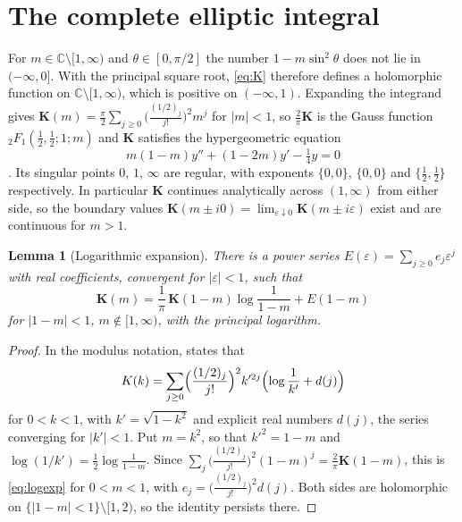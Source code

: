 \documentclass[11pt]{amsart}
\numberwithin{equation}{section}
\newtheorem{lemma}[theorem]{Lemma}
\theoremstyle{definition}
\theoremstyle{remark}
\newcommand{\C}{\mathbb{C}}
\newcommand{\Kc}{\mathbf{K}}
\begin{document}
\section{The complete elliptic integral}\label{sec:elliptic}

For $m\in\C\setminus[1,\infty)$ and $\theta\in[0,\pi/2]$ the number
$1-m\sin^2\theta$ does not lie in $(-\infty,0]$. With the principal square
root, \eqref{eq:K} therefore defines a holomorphic function on
$\C\setminus[1,\infty)$, which is positive on $(-\infty,1)$. Expanding the
integrand gives $\Kc(m)=\frac\pi2\sum_{j\ge0}\bigl(\frac{(1/2)_j}{j!}\bigr)^2m^j$
for $|m|<1$, so $\frac2\pi\Kc$ is the Gauss function
${}_2F_1(\frac12,\frac12;1;m)$ and $\Kc$ satisfies the hypergeometric equation
\begin{equation}\label{eq:hyp}
m(1-m)y''+(1-2m)y'-\tfrac14y=0
\end{equation}
\cite[Section~15.10]{DLMF}. Its singular points $0$, $1$, $\infty$ are regular, with
exponents $\{0,0\}$, $\{0,0\}$ and $\{\frac12,\frac12\}$ respectively. In
particular $\Kc$ continues analytically across $(1,\infty)$ from either side,
so the boundary values $\Kc(m\pm i0)=\lim_{\varepsilon\downarrow0}\Kc(m\pm i\varepsilon)$
exist and are continuous for $m>1$.

\begin{lemma}[Logarithmic expansion]\label{lem:log}
There is a power series $E(\varepsilon)=\sum_{j\ge0}e_j\varepsilon^j$ with real
coefficients, convergent for $|\varepsilon|<1$, such that
\begin{equation}\label{eq:logexp}
\Kc(m)=\frac1\pi\,\Kc(1-m)\log\frac{1}{1-m}+E(1-m)
\end{equation}
for $|1-m|<1$, $m\notin[1,\infty)$, with the principal logarithm.
\end{lemma}

\begin{proof}
In the modulus notation, \cite[19.12.1]{DLMF} states that
\[
K(k)=\sum_{j\ge0}\Bigl(\frac{(1/2)_j}{j!}\Bigr)^2k'^{2j}\Bigl(\log\frac1{k'}+d(j)\Bigr)
\]
for $0<k<1$, with $k'=\sqrt{1-k^2}$ and explicit real numbers $d(j)$, the
series converging for $|k'|<1$. Put $m=k^2$, so that $k'^2=1-m$ and
$\log(1/k')=\frac12\log\frac1{1-m}$. Since
$\sum_j\bigl(\frac{(1/2)_j}{j!}\bigr)^2(1-m)^j=\frac2\pi\Kc(1-m)$, this is
\eqref{eq:logexp} for $0<m<1$, with
$e_j=\bigl(\frac{(1/2)_j}{j!}\bigr)^2d(j)$. Both sides are holomorphic on
$\{|1-m|<1\}\setminus[1,2)$, so the identity persists there.
\end{proof}
\end{document}
